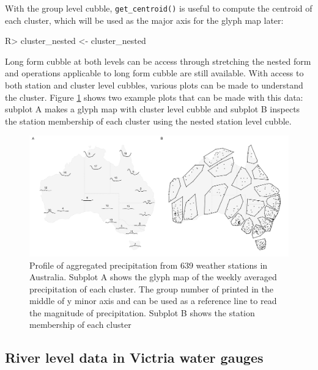 \documentclass[
]{jss}
\begin{document}
With the group level cubble, \texttt{get\_centroid()} is useful to
compute the centroid of each cluster, which will be used as the major
axis for the glyph map later:

\begin{CodeChunk}
\begin{CodeInput}
R> cluster_nested <- cluster_nested %
\end{CodeInput}
\end{CodeChunk}

Long form cubble at both levels can be access through stretching the
nested form and operations applicable to long form cubble are still
available. With access to both station and cluster level cubbles,
various plots can be made to understand the cluster. Figure
\ref{fig:basic-agg} shows two example plots that can be made with this
data: subplot A makes a glyph map with cluster level cubble and subplot
B inspects the station membership of each cluster using the nested
station level cubble.

\begin{CodeChunk}
\begin{figure}

{\centering \includegraphics[width=1\linewidth]{figures/basic-agg} 

}

\caption[Profile of aggregated precipitation from 639 weather stations in Australia]{Profile of aggregated precipitation from 639 weather stations in Australia. Subplot A shows the glyph map of the weekly averaged precipitation of each cluster. The group number of printed in the middle of y minor axis and can be used as a reference line to read the magnitude of precipitation. Subplot B shows the station membership of each cluster}\label{fig:basic-agg}
\end{figure}
\end{CodeChunk}

\hypertarget{river-level-data-in-victria-water-gauges}{%
\subsection{River level data in Victria water
gauges}\label{river-level-data-in-victria-water-gauges}}
\end{document}
